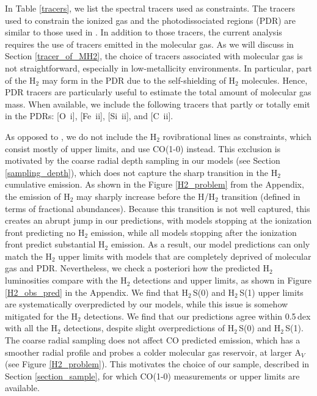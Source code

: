 \documentclass{aa}
\newcommand{\oi}{[O~{\sc i}]}
\newcommand{\cii}{[C~{\sc ii}]}
\newcommand{\feii}{[Fe~{\sc ii}]}
\newcommand{\silii}{[Si~{\sc ii}]}
\begin{document}
In Table \ref{tracers}, we list the spectral tracers used as constraints. The tracers used to constrain the ionized gas and the photodissociated regions (PDR) are similar to those used in \cite{Ramambason2022}. In addition to those tracers, the current analysis requires the use of tracers emitted in the molecular gas. As we will discuss in Section \ref{tracer_of_MH2}, the choice of tracers associated with molecular gas is not straightforward, especially in low-metallicity environments. In particular, part of the H$_2$ may form in the PDR due to the self-shielding of H$_2$ molecules. Hence, PDR tracers are particularly useful to estimate the total amount of molecular gas mass. When available, we include the following tracers that partly or totally emit in the PDRs: \oi, \feii, \silii, and \cii.

As opposed to \cite{Ramambason2022}, we do not include the H$_2$ rovibrational lines as constraints, which consist mostly of upper limits, and use CO(1-0) instead. This exclusion is motivated by the coarse radial depth sampling in our models (see Section \ref{sampling_depth}), which does not capture the sharp transition in the H$_2$ cumulative emission. As shown in the Figure \ref{H2_problem} from the Appendix, the emission of H$_2$ may sharply increase before the H/H$_2$ transition (defined in terms of fractional abundances). Because this transition is not well captured, this creates an abrupt jump in our predictions, with models stopping at the ionization front predicting no H$_2$ emission, while all models stopping after the ionization front predict substantial H$_2$ emission. As a result, our model predictions can only match the H$_2$ upper limits with models that are completely deprived of molecular gas and PDR. Nevertheless, we check a posteriori how the predicted H$_2$ luminosities compare with the H$_2$ detections and upper limits, as shown in Figure \ref{H2_obs_pred} in the Appendix. We find that H$_2$\,S(0) and H$_2$\,S(1) upper limits are systematically overpredicted by our models, while this issue is somehow mitigated for the H$_2$ detections. We find that our predictions agree  within 0.5\,dex with all the H$_2$ detections, despite slight overpredictions of H$_2$\,S(0) and H$_2$\,S(1).
The coarse radial sampling does not affect CO predicted emission, which has a smoother radial profile and probes a colder molecular gas reservoir, at larger A$_V$ (see Figure \ref{H2_problem}). This motivates the choice of our sample, described in Section \ref{section_sample}, for which CO(1-0) measurements or upper limits are available. 
\end{document}
